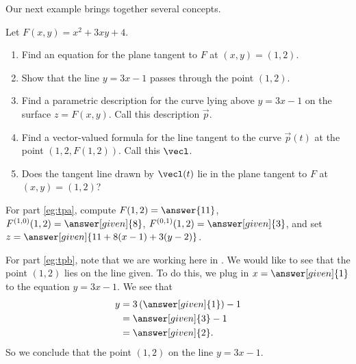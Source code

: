 \documentclass{ximera}
\begin{document}
Our next example brings together several concepts.
\begin{example}
  Let $F(x,y) = x^2 + 3xy + 4$.
  \begin{enumerate}
  \item\label{eg:tpa} Find an equation for the plane tangent to $F$ at $(x,y) =
    (1,2)$.
  \item\label{eg:tpb} Show that the line $y = 3x - 1$ passes through the point $(1,2)$.
  \item\label{eg:tpc} Find a parametric description for the curve
    lying above $y = 3x-1$ on the surface $z = F(x,y)$. Call this
    description $\vec{p}$.
  \item\label{eg:tpd} Find a vector-valued formula for the line tangent to the curve
    $\vec{p}(t)$ at the point $(1, 2, F(1,2))$. Call this $\vecl$.
  \item\label{eg:tpe} Does the tangent line drawn by $\vecl(t)$ lie in the plane
    tangent to $F$ at $(x,y)=(1,2)$?
  \end{enumerate}
  \begin{explanation}
    For part \ref{eg:tpa}, compute $F(1,2) = \answer{11}$,
    $F^{(1,0)}(1,2) = \answer[given]{8}$, $F^{(0,1)}(1,2) =
    \answer[given]{3}$, and set $z = \answer[given]{11 + 8(x-1) +
      3(y-2)}$.

    For part \ref{eg:tpb}, note that we are working here in
    .  We would like to see that the point
    $(1,2)$ lies on the line given.  To do this, we plug in $x =
    \answer[given]{1}$ to the equation $y = 3x - 1$.  We see that
          \begin{align*}
            y &= 3\left(\answer[given]{1}\right) - 1 \\
            &= \answer[given]{3} - 1 \\
            &= \answer[given]{2}.
          \end{align*}
          So we conclude that the point $(1, 2)$
           on the
          line $y = 3x-1$.
 

\end{explanation}
\end{example}
\end{document}
